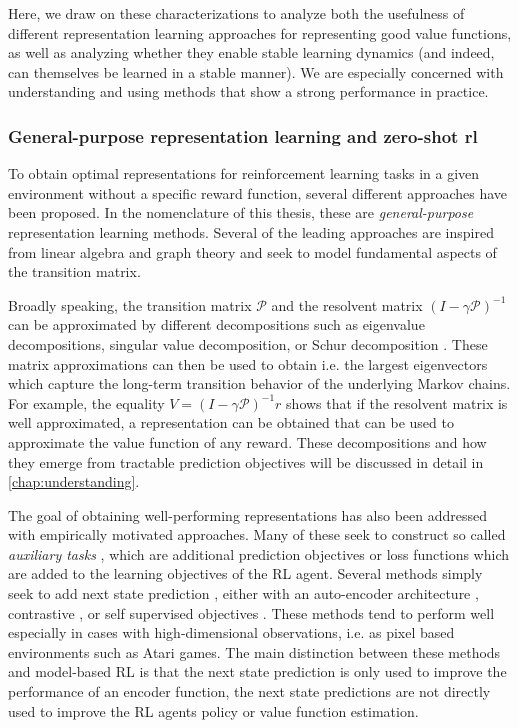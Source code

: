 Here, we draw on these characterizations to analyze both the usefulness of different representation learning approaches for representing good value functions, as well as analyzing whether they enable stable learning dynamics (and indeed, can themselves be learned in a stable manner).
We are especially concerned with understanding and using methods that show a strong performance in practice.

\subsubsection{General-purpose representation learning and zero-shot \ac{rl}}

To obtain optimal representations for reinforcement learning tasks in a given environment without a specific reward function, several different approaches have been proposed.
In the nomenclature of this thesis, these are \emph{general-purpose} representation learning methods.
Several of the leading approaches are inspired from linear algebra and graph theory and seek to model fundamental aspects of the transition matrix.

Broadly speaking, the transition matrix $\mathcal{P}$ and the resolvent matrix $(I - \gamma \mathcal{P})^{-1}$ can be approximated by different decompositions such as eigenvalue decompositions, singular value decomposition, or Schur decomposition \parencite{ghosh2020representations}.
These matrix approximations can then be used to obtain i.e. the largest eigenvectors which capture the long-term transition behavior of the underlying Markov chains.
For example, the equality $V = (I - \gamma \mathcal{P})^{-1} r$ shows that if the resolvent matrix is well approximated, a representation can be obtained that can be used to approximate the value function of any reward.
These decompositions and how they emerge from tractable prediction objectives will be discussed in detail in \autoref{chap:understanding}.

The goal of obtaining well-performing representations has also been addressed with empirically motivated approaches.
Many of these seek to construct so called \emph{auxiliary tasks} \parencite{jaderberg2017reinforcement}, which are additional prediction objectives or loss functions which are added to the learning objectives of the RL agent.
Several methods simply seek to add next state prediction , either with an auto-encoder architecture \parencite{jaderberg2017reinforcement}, contrastive \parencite{laskin2020contrastive}, or self supervised objectives \parencite{gelada2019deepmdp,schwarzer2021dataefficient,schwarzer2021pretraining,tang2022understanding}.
These methods tend to perform well especially in cases with high-dimensional observations, i.e. as pixel based environments such as Atari games.
The main distinction between these methods and model-based RL is that the next state prediction is only used to improve the performance of an encoder function, the next state predictions are not directly used to improve the RL agents policy or value function estimation.

